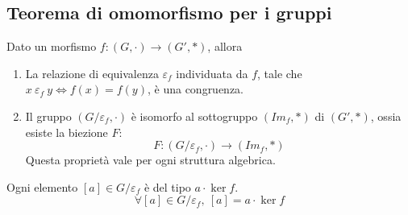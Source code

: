 
\subsection{Teorema di omomorfismo per i gruppi}

\begin{theorem}
Dato un morfismo $f : (G, \cdot) \to (G', \ast)$, allora 
\begin{enumerate}
    \item La relazione di equivalenza $\varepsilon_f$ individuata da $f$, tale che $x \ \varepsilon_f \ y \Leftrightarrow f(x) = f(y)$, \`e una congruenza.
    \item Il gruppo $(G / \varepsilon_f, \cdot)$ \`e isomorfo al sottogruppo $(Im_f, \ast)$ di $(G', \ast)$, ossia esiste la biezione $F$:
    \[
    F : (G / \varepsilon_f, \cdot) \to (Im_f, \ast)
    \]
    Questa propriet\`a vale per ogni struttura algebrica.
\end{enumerate}
Ogni elemento $[a] \in G / \varepsilon_f$ \`e del tipo $a \cdot \ker f$.
\[
\forall [a] \in G / \varepsilon_f , \ [a] = a \cdot \ker f
\]
\end{theorem}


